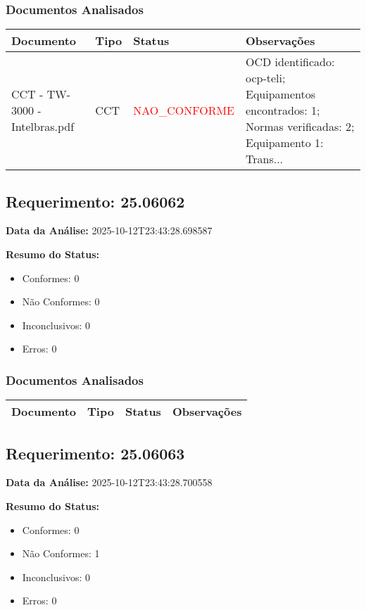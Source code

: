 \documentclass[12pt,a4paper]{article}
\begin{document}
\subsubsection{Documentos Analisados}

\begin{longtable}{|p{4cm}|p{2cm}|p{2cm}|p{6cm}|}
\hline
\textbf{Documento} & \textbf{Tipo} & \textbf{Status} & \textbf{Observações} \\
\hline
\endhead
CCT - TW-3000 - Intelbras.pdf & CCT & \textcolor{red}{NAO\_CONFORME} & OCD identificado: ocp-teli; Equipamentos encontrados: 1; Normas verificadas: 2; Equipamento 1: Trans... \\
\hline
\end{longtable}


\subsection{Requerimento: 25.06062}

\textbf{Data da Análise:} 2025-10-12T23:43:28.698587

\textbf{Resumo do Status:}
\begin{itemize}
    \item Conformes: 0
    \item Não Conformes: 0
    \item Inconclusivos: 0
    \item Erros: 0
\end{itemize}

\subsubsection{Documentos Analisados}

\begin{longtable}{|p{4cm}|p{2cm}|p{2cm}|p{6cm}|}
\hline
\textbf{Documento} & \textbf{Tipo} & \textbf{Status} & \textbf{Observações} \\
\hline
\endhead
\end{longtable}


\subsection{Requerimento: 25.06063}

\textbf{Data da Análise:} 2025-10-12T23:43:28.700558

\textbf{Resumo do Status:}
\begin{itemize}
    \item Conformes: 0
    \item Não Conformes: 1
    \item Inconclusivos: 0
    \item Erros: 0
\end{itemize}
\end{document}
